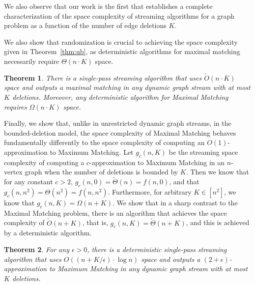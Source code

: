 \documentclass[11pt,a4paper]{article}
\newtheorem{theorem}{Theorem}
\begin{document}
We also observe that our work is the first that establishes a complete characterization of the space complexity of streaming algorithms for a graph problem as a function of the number of edge deletions $K$. 

We also show that randomization is crucial to achieving the space complexity given in Theorem~\ref{thm:ub}, as deterministic algorithms for maximal matching necessarily require $\Theta(n \cdot K)$ space. 

\begin{theorem}
\label{thm:det_maximal}
There is a single-pass streaming algorithm that uses $\tilde{O}(n \cdot K)$ space and outputs a maximal matching in any dynamic graph stream with at most $K$ deletions. Moreover, any deterministic algorithm for \textsf{Maximal Matching} requires $\Omega(n \cdot K)$ space.
\end{theorem}
\setcounter{counterDET}{\value{theorem}}


Finally, we show that, unlike in unrestricted dynamic graph streams, in the bounded-deletion model, the space complexity of \textsf{Maximal Matching} behaves fundamentally differently to the space complexity of computing an $O(1)$-approximation to \textsf{Maximum Matching}. Let $g_c(n,K)$ be the streaming space complexity of computing a $c$-approximation to \textsf{Maximum Matching} in an $n$-vertex graph when the number of deletions is bounded by $K$. Then we know that for any constant $c > 2$, $g_c(n,0) = \tilde{\Theta}(n)=f(n,0)$, and that $g_c(n,n^2) = \Theta(n^2)=f(n,n^2)$. Furthermore, for arbitrary $K \in [n^2]$, we know that $g_c(n,K) = \Omega(n+K)$. We show that in a sharp contrast to the \textsf{Maximal Matching} problem, there is an algorithm that achieves the space complexity of $\tilde{O}(n+K)$, that is, $g_c(n,K) = \tilde{\Theta}(n+K)$, and this is achieved by a deterministic algorithm.


\begin{theorem}\label{thm:ub2}
For any $\epsilon > 0$, there is a deterministic single-pass streaming algorithm that uses $O((n + K/\epsilon) \cdot \log n)$ space and outputs a $(2+\epsilon)$-approximation to \textsf{Maximum Matching} in any dynamic graph stream with at most $K$ deletions.
\end{theorem}
\setcounter{counterUB2}{\value{theorem}}
\end{document}
